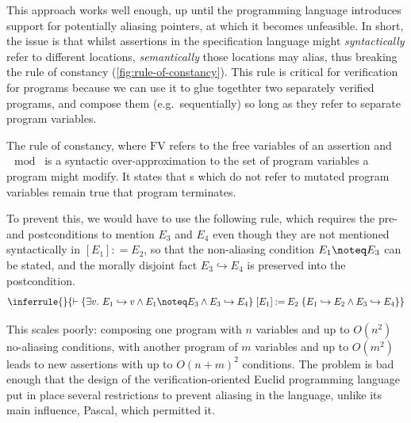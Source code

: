This approach works well enough, up until the programming language introduces
support for potentially aliasing pointers, at which it becomes
unfeasible. In short, the issue is that
whilst assertions in the specification language might \emph{syntactically}
refer to different locations, \emph{semantically} those locations may alias,
thus breaking the rule of constancy (\cref{fig:rule-of-constancy}). This rule
is critical for  verification for programs because we can use it
to glue togethter two separately verified programs, and compose them (e.g.\
sequentially) so long as they refer to separate program variables.

\begin{marginfigure}
  \begin{mathpar}
  \end{mathpar}
  \caption{The rule of constancy, where $\mathrm{FV}$ refers to the free
      variables of an assertion and $\mod{}$ is a syntactic
      over-approximation to the set of program variables a program might
      modify. It states that \kl{precondition}s which do not refer to mutated
      program variables remain true that program terminates.}\label{fig:rule-of-constancy}
\end{marginfigure}

To prevent this, we would have to use the following rule, which requires the
pre- and postconditions to mention $E_3$ and $E_4$ even though they are not
mentioned syntactically in $ [ E_1 ] \mathbin{{:}{=}} E_2$, so that the
non-aliasing condition $E_1 \noteq E_3$ can be stated, and the morally disjoint
fact $E_3 \hookrightarrow{} E_4$ is preserved into the postcondition.%
\[
    \inferrule{}{\vdash{} \{ \exists{} v.\ E_1 \hookrightarrow{} v \wedge{} E_1 \noteq E_3 \wedge{} E_3 \hookrightarrow{} E_4 \} \; [ E_1 ] \mathbin{{:}{=}} E_2 \; \{ E_1 \hookrightarrow{} E_2 \wedge{} E_3 \hookrightarrow{} E_4 \} }
\]

This scales poorly: composing one program with $n$ variables and up to $O(n^2)$
no-aliasing conditions, with another program of $m$ variables and up to
$O(m^2)$ leads to new assertions with up to ${O(n + m)}^2$ conditions. The
problem is bad enough that the design of the verification-oriented Euclid
programming language put in place several restrictions to prevent aliasing in
the language, unlike its main influence, Pascal, which permitted
it.\sidecite{popek1977notes}


